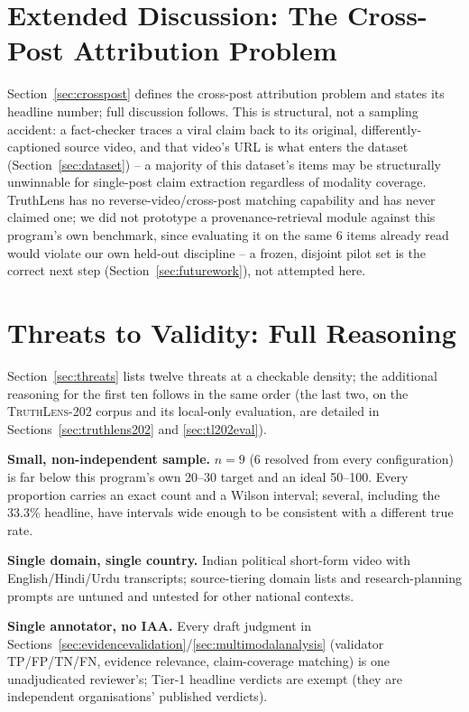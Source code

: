 \documentclass[conference]{IEEEtran}
\begin{document}
\section{Extended Discussion: The Cross-Post Attribution Problem}
\label{sec:appendixcrosspost}
Section~\ref{sec:crosspost} defines the cross-post attribution problem
and states its headline number; full discussion follows. This is
structural, not a sampling accident: a fact-checker traces a viral claim
back to its original, differently-captioned source video, and that
video's URL is what enters the dataset (Section~\ref{sec:dataset}) -- a
majority of this dataset's items may be structurally unwinnable for
single-post claim extraction regardless of modality coverage. TruthLens
has no reverse-video/cross-post matching capability and has never
claimed one; we did not prototype a provenance-retrieval module against
this program's own benchmark, since evaluating it on the same 6 items
already read would violate our own held-out discipline -- a frozen,
disjoint pilot set is the correct next step (Section~\ref{sec:futurework}),
not attempted here.

\section{Threats to Validity: Full Reasoning}
\label{sec:appendixthreats}

Section~\ref{sec:threats} lists twelve threats at a checkable density;
the additional reasoning for the first ten follows in the same order (the
last two, on the \textsc{TruthLens-202} corpus and its local-only
evaluation, are detailed in Sections~\ref{sec:truthlens202} and
\ref{sec:tl202eval}).

\textbf{Small, non-independent sample.} $n=9$ (6 resolved from every
configuration) is far below this program's own 20--30 target and an ideal
50--100. Every proportion carries an exact count and a Wilson interval;
several, including the 33.3\% headline, have intervals wide enough to be
consistent with a different true rate.

\textbf{Single domain, single country.} Indian political short-form video
with English/Hindi/Urdu transcripts; source-tiering domain lists and
research-planning prompts are untuned and untested for other national
contexts.

\textbf{Single annotator, no IAA.} Every draft judgment in
Sections~\ref{sec:evidencevalidation}/\ref{sec:multimodalanalysis}
(validator TP/FP/TN/FN, evidence relevance, claim-coverage matching) is
one unadjudicated reviewer's; Tier-1 headline verdicts are exempt (they
are independent organisations' published verdicts).
\end{document}
